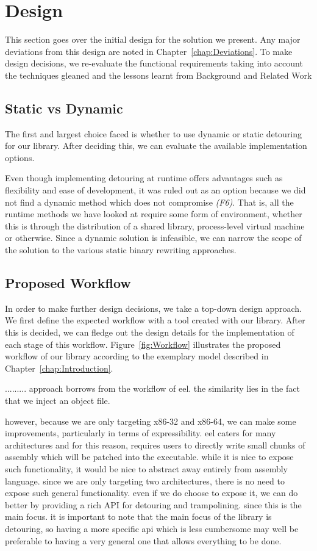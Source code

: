\chapter{Design}\label{chap:Design}

This section goes over the initial design for the solution we present. Any major deviations from this design are noted in Chapter~\ref{chap:Deviations}. To make design decisions, we re-evaluate the functional requirements taking into account the techniques gleaned and the lessons learnt from Background and Related Work

\section{Static vs Dynamic}

The first and largest choice faced is whether to use dynamic or static detouring for our library. After deciding this, we can evaluate the available implementation options.

Even though implementing detouring at runtime offers advantages such as flexibility and ease of development, it was ruled out as an option because we did not find a dynamic method which does not compromise \emph{(F6)}. That is, all the runtime methods we have looked at require some form of environment, whether this is through the distribution of a shared library, process-level virtual machine or otherwise. Since a dynamic solution is infeasible, we can narrow the scope of the solution to the various static binary rewriting approaches.

\section{Proposed Workflow}

In order to make further design decisions, we take a top-down design approach. We first define the expected workflow with a tool created with our library. After this is decided, we can fledge out the design details for the implementation of each stage of this workflow. Figure~\ref{fig:Workflow} illustrates the proposed workflow of our library according to the exemplary model described in Chapter~\ref{chap:Introduction}.

.........
approach borrows from the workflow of eel. the similarity lies in the fact that we inject an object file.

however, because we are only targeting x86-32 and x86-64, we can make some improvements, particularly in terms of expressibility. eel caters for many architectures and for this reason, requires users to directly write small chunks of assembly which will be patched into the executable. while it is nice to expose such functionality, it would be nice to abstract away entirely from assembly language. since we are only targeting two architectures, there is no need to expose such general functionality. even if we do choose to expose it, we can do better by providing a rich API for detouring and trampolining. since this is the main focus. it is important to note that the main focus of the library is detouring, so having a more specific api which is less cumbersome may well be preferable to having a very general one that allows everything to be done.

